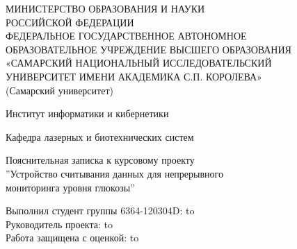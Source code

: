 \begin{titlepage}
\newpage
\begin{doublespace}
\begin{center}
МИНИСТЕРСТВО ОБРАЗОВАНИЯ И НАУКИ \\
РОССИЙСКОЙ ФЕДЕРАЦИИ\\
ФЕДЕРАЛЬНОЕ ГОСУДАРСТВЕННОЕ АВТОНОМНОЕ\\
ОБРАЗОВАТЕЛЬНОЕ УЧРЕЖДЕНИЕ ВЫСШЕГО ОБРАЗОВАНИЯ\\
«САМАРСКИЙ НАЦИОНАЛЬНЫЙ ИССЛЕДОВАТЕЛЬСКИЙ\\
УНИВЕРСИТЕТ ИМЕНИ АКАДЕМИКА С.П. КОРОЛЕВА»	\\
(Самарский университет) \\
\end{center}

\vspace{4em}

\begin{center}
Институт информатики и кибернетики \\ 
\end{center}

\begin{center}
Кафедра лазерных и биотехнических систем \\ 
\end{center}


\vspace{3em}

\begin{center}
{Пояснительная записка к курсовому проекту\\''Устройство считывания данных для непрерывного \\мониторинга уровня глюкозы''}
\end{center}

\vspace{9em}




\newbox{\lbox}
\newlength{\maxl}
\setlength{\maxl}{\wd\lbox}
\hfill\parbox{15cm}{
\hspace*{5cm}\hspace*{-5cm}Выполнил студент группы 6364-120304D:\hfill\underline{\hspace{4em}}  \hbox to\\
\hspace*{5cm}\hspace*{-5cm}Руководитель проекта:\hfill\underline{\hspace{4em}}  \hbox to\\
\hspace*{5cm}\hspace*{-5cm}Работа защищена с оценкой:\hfill\underline{\hspace{4em}}  \hbox to\maxl{ \hfill }\\
}



\end{doublespace}
\end{titlepage}

